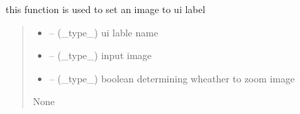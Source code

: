 \documentclass[letterpaper,10pt,english]{sphinxmanual}
\begin{document}
\begin{savenotes}\begin{fulllineitems}
\label{\detokenize{setting/backend/camera_funcs:oxin.backend.camera_funcs.set_camera_picture_to_ui}}
\pysigstartsignatures
{}
\pysigstopsignatures
\sphinxAtStartPar
this function is used to set an image to ui label
\begin{quote}\begin{description}
\begin{itemize}
\item {} 
\sphinxAtStartPar
{} – (\_type\_) ui lable name

\item {} 
\sphinxAtStartPar
{} – (\_type\_) input image

\item {} 
\sphinxAtStartPar
{} – (\_type\_) boolean determining wheather to zoom image

\end{itemize}

\sphinxAtStartPar
None

\end{description}\end{quote}

\end{fulllineitems}\end{savenotes}

\end{document}
